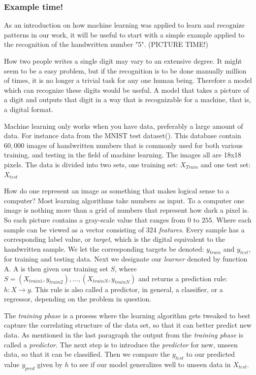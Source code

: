	\subsubsection{Example time!}
	As an introduction on how machine learning was applied to learn and recognize patterns in our work, it will be useful to start with a simple example applied to the recognition of the handwritten number "5". (PICTURE TIME!)
	
	How two people writes a single digit may vary to an extensive degree. It might seem to be a easy problem, but if the recognition is to be done manually million of times, it is no longer a trivial task for any one human being. Therefore a model which can recognize these digits would be useful. A model that takes a picture of a digit and outputs that digit in a way that is recognizable for a machine, that is, a digital format.
	
	Machine learning only works when you have data, preferably a large amount of data. For instance data from the MNIST test dataset(\cite{lecun1998gradient}). This database contain $60,000$ images of handwritten numbers that is commonly used for both various training, and testing in the field of machine learning. The images all are 18x18 pixels. The data is divided into two sets, one training set: $X_{Train}$ and one test set: $X_{test}$
	
	How do one represent an image as something that makes logical sense to a computer? Most learning algorithms take numbers as input. To a computer one image is nothing more than a grid of numbers that represent how dark a pixel is. So each picture contains a gray-scale value that ranges from $0$ to $255$. Where each sample can be viewed as a vector consisting of 324 \textit{features}. Every sample has a corresponding label value, or \textit{target}, which is the digital equivalent to the handwritten sample. We let the corresponding targets be denoted: $y_{train}$ and $y_{test}$, for training and testing data. Next we designate our \textit{learner} denoted by function A. A is then given our training set $S$, where $S = (X_{train1}, y_{train2}),..., (X_{trainN}, y_{trainN})$ and returns a prediction rule: $h: X \rightarrow y$. This rule is also called a predictor, in general, a classifier, or a regressor, depending on the problem in question. 
	
	The \textit{training phase} is a prosess where the learning algorithm gets tweaked to best capture the correlating structure of the data set, so that it can better predict new data. As mentioned in the last paragraph the output from the \textit{training phase} is called a \textit{predictor}. The next step is to introduce the \textit{predictor} for new, unseen data, so that it can be classified. Then we compare the $y_{test}$ to our predicted value $y_{pred}$ given by $h$ to see if our model generalizes well to unseen data in $X_{test}$. 
	
